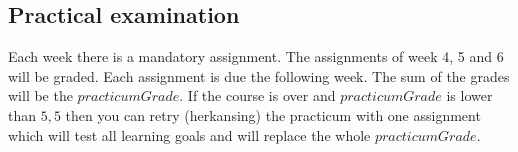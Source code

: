 \subsection{Practical examination \modulecode}
Each week there is a mandatory assignment. The assignments of week 4, 5 and 6 will be graded. Each assignment is due the following week. The sum of the grades will be the $practicumGrade$. 
If the course is over and $practicumGrade$ is lower than $5,5$ then you can retry (herkansing) the practicum with one assignment which will test all learning goals and will replace the whole $practicumGrade$. 


